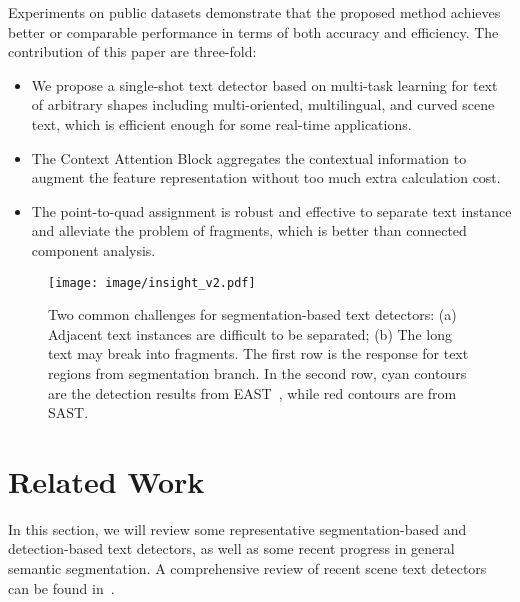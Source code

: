 \documentclass[sigconf]{acmart}
\begin{document}
Experiments on public datasets demonstrate that the proposed method achieves better or comparable performance in terms of both accuracy and efficiency. The contribution of this paper are three-fold:
\begin{itemize}
\item[] We propose a single-shot text detector based on multi-task learning for text of arbitrary shapes including multi-oriented, multilingual, and curved scene text, which is efficient enough for some real-time applications.
\item[] The Context Attention Block aggregates the contextual information to augment the feature representation without too much extra calculation cost.
\item[] The point-to-quad assignment is robust and effective to separate text instance and alleviate the problem of fragments, which is better than connected component analysis.
\end{itemize}





\begin{figure}
\texttt{[image: image/insight\_v2.pdf]}
\caption{Two common challenges for segmentation-based text detectors: (a) Adjacent text instances are difficult to be separated; (b) The long text may break into fragments. The first row is the response for text regions from segmentation branch. In the second row, cyan contours are the detection results from EAST~\cite{zhou2017east}, while red contours are from SAST.} 
  \label{fig:insight}
\end{figure}



\section{Related Work}


In this section, we will review some representative segmentation-based and detection-based text detectors, as well as some recent progress in general semantic segmentation. A comprehensive review of recent scene text detectors can be found in~\cite{ ye2015text, zhu2016scene}.
\end{document}
